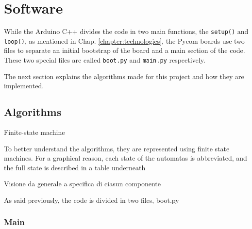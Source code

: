 	\section{Software}
	
	
	
	
	
		While the Arduino C++ divides the code in two main functions, the \texttt{setup()} and \texttt{loop()}, as mentioned in Chap. \ref{chapter:technologies}, the Pycom boards use two files to separate an initial bootstrap of the board and a main section of the code.
		These two special files are called \texttt{boot.py} and \texttt{main.py} respectively.
		
		The next section explains the algorithms made for this project and how they are implemented.
		
		\subsection{Algorithms}\label{subsec:algorithms}
	
		
			Finite-state machine
		
			To better understand the algorithms, they are represented using finite state machines.
			For a graphical reason, each state of the automatas is abbreviated, and the full state is described in a table underneath
			
			Visione da generale a specifica di ciasun componente
			
			As said previously, the code is divided in two files, boot.py
			
			\subsubsection{Main}
				
